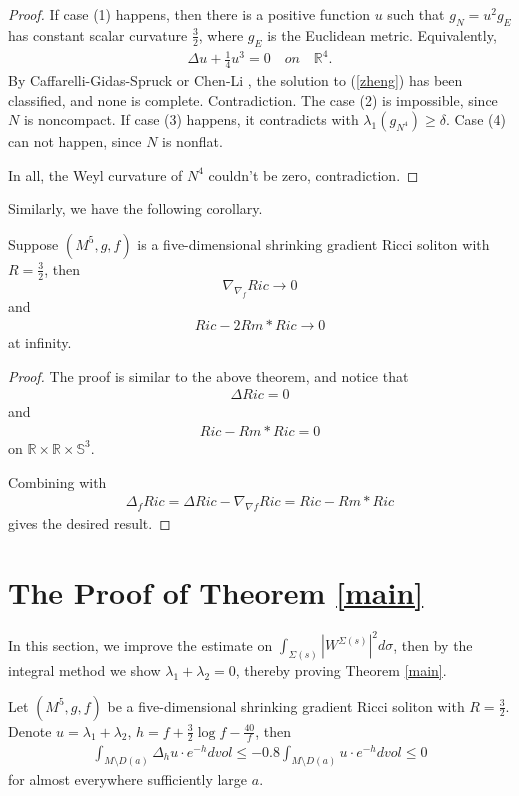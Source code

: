 \documentclass[12pt]{amsart}
\newcommand{\ba}{\begin{eqnarray}}
\newcommand{\ea}{\end{eqnarray}}
\newcommand{\ban}{\begin{eqnarray*}}
\newcommand{\ean}{\end{eqnarray*}}
\begin{document}
\begin{proof}
	If  case (1) happens, then there is a positive function $u$ such that $g_N=u^2 g_{E}$ has constant scalar curvature $\frac{3}{2}$, where $g_E$ is the Euclidean metric.  Equivalently,
	\ba\label{zheng}
	\Delta u+\frac{1}{4} u^3 =0 \quad on \quad  \mathbb{R}^4.
	\ea
	By  Caffarelli-Gidas-Spruck \cite{Caffarelli-Gidas-Spruck} or Chen-Li \cite{Chen-Li}, the solution to (\ref{zheng}) has been classified, and none is complete.  Contradiction. The case (2) is impossible, since $N$ is noncompact. If case (3) happens,  it contradicts with $\lambda_1(g_{N^4})\geq \delta$.  Case (4) can not happen, since $N$ is nonflat.
	
	In all, the Weyl curvature of $N^4$ couldn't be zero, contradiction.
\end{proof}

Similarly, we have the following corollary.
\begin{coro}
	Suppose $(M^5, g, f)$ is a five-dimensional shrinking gradient Ricci soliton with $R=\frac{3}{2}$, then
	\[
	\nabla_{\nabla_f}Ric \rightarrow 0	
	\]
	and
	\ban
	Ric-2 Rm*Ric\rightarrow 0
	\ean
	at infinity.
\end{coro}
\begin{proof}
	The proof is similar to the above theorem, and notice that
	\ban
	\Delta Ric=0
	\ean
	and
	\ban
	Ric-Rm*Ric=0
	\ean
	on $\mathbb{R}\times \mathbb{R}\times \mathbb{S}^3$.
	
	Combining with
	\ban
	\Delta_f Ric=\Delta Ric -\nabla_{\nabla f}Ric=Ric-Rm*Ric
	\ean
	gives the desired result.
	
\end{proof}


\section{The Proof of Theorem \ref{main}}\label{sec6}

In this section, we improve the estimate on $\int_{\Sigma(s)}|W^{\Sigma(s)}|^2d\sigma$, then by the integral method we show $\lambda_1+\lambda_2=0$, thereby proving Theorem \ref{main}.


\begin{prop}\label{first ineqality}
	Let $(M^5, g, f)$ be a five-dimensional shrinking gradient Ricci soliton with $R=\frac{3}{2}$. Denote $u=\lambda_1+\lambda_2$, $h=f+\frac{3}{2}\log f-\frac{40}{f}$, then
	\ban
	\int_{M\setminus D(a)} \Delta_h u\cdot e^{-h}dvol
	\leq -0.8\int_{M\setminus D(a)}u\cdot e^{-h} dvol
	\leq  0
	\ean
for almost everywhere sufficiently large $a$.
\end{prop}
\end{document}
